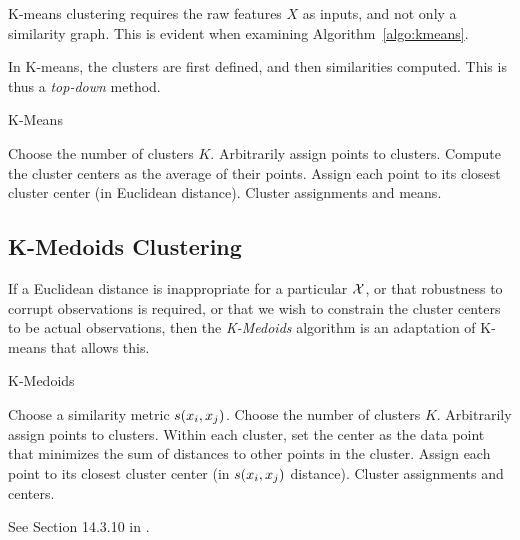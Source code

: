 K-means clustering requires the raw features $X$ as inputs, and not only a similarity graph. This is evident when examining Algorithm~\ref{algo:kmeans}.

In K-means, the clusters are first defined, and then similarities computed. This is thus a \emph{top-down} method.

\begin{algorithm}[H]
\caption{K-Means}
\label{algo:kmeans}
\begin{algorithmic}
\State Choose the number of clusters $K$.
\State Arbitrarily assign points to clusters.
	\State Compute the cluster centers as the average of their points.
	\State Assign each point to its closest cluster center (in Euclidean distance).
\EndWhile
\State \Return Cluster assignments and means.
\end{algorithmic}
\end{algorithm}





\subsection{K-Medoids Clustering}
\label{sec:k_medoids}


If a Euclidean distance is inappropriate for a particular $\mathcal{X}$, or that robustness to corrupt observations is required, or that we wish to constrain the cluster centers to be actual observations, then the \emph{K-Medoids} algorithm is an adaptation of K-means that allows this.

\begin{algorithm}[H]
\caption{K-Medoids}
\begin{algorithmic}
\State Choose a similarity metric $s(x_i,x_j)$.
\State Choose the number of clusters $K$.
\State Arbitrarily assign points to clusters.
	\State Within each cluster, set the center as the data point that minimizes the sum of distances to other points in the cluster.
	\State Assign each point to its closest cluster center (in $s(x_i,x_j)$ distance).
\EndWhile
\State \Return Cluster assignments and centers.
\end{algorithmic}
\end{algorithm}


See Section 14.3.10 in \cite{hastie_elements_2003}.








